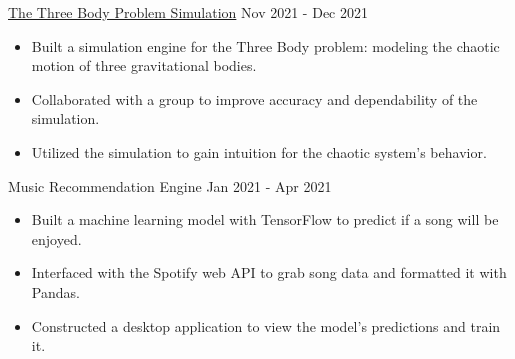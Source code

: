 \documentclass[9pt]{resume}
\begin{document}
\begin{experiencelist}
        \experiencenocompany
            {\href{https://github.com/TheSharkhead2/third_body_simulation}{The Three Body Problem Simulation}}
            {Nov 2021 - Dec 2021}
            {\begin{itemize}[noitemsep, topsep=1pt]
                \item Built a simulation engine for the Three Body problem: modeling the chaotic motion of three gravitational bodies. 
                \item Collaborated with a group to improve accuracy and dependability of the simulation.
                \item Utilized the simulation to gain intuition for the chaotic system's behavior.
            \end{itemize}}
        \experiencenocompany
            {Music Recommendation Engine}
            {Jan 2021 - Apr 2021}
            {\begin{itemize}[noitemsep, topsep=1pt]
                \item Built a machine learning model with TensorFlow to predict if a song will be enjoyed.
                \item Interfaced with the Spotify web API to grab song data and formatted it with Pandas. 
                \item Constructed a desktop application to view the model's predictions and train it.
            \end{itemize}}
    \end{experiencelist}
    \vspace{-0.4cm}
\end{document}
